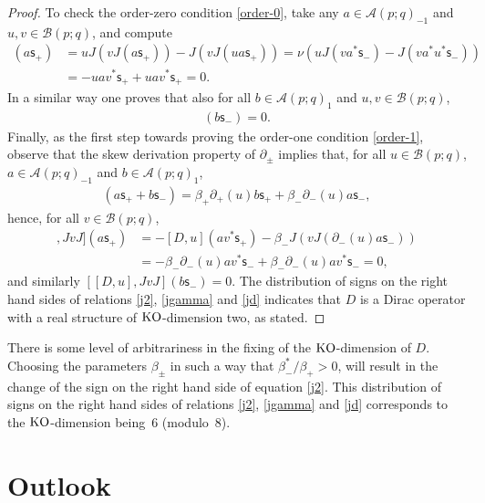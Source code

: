 \documentclass[pdftex]{sigma}
\numberwithin{equation}{section}
\def\Weyl#1#2{{\mathcal{B}}(#1;#2)}
\def\AWeyl#1#2{{\mathcal{A}}(#1;#2)}
\begin{document}
\begin{proof}
To check the order-zero condition \eqref{order-0}, take any $a\in \AWeyl p q_{-1}$ and $u,v\in \Weyl p q$, and compute
\begin{align*}
[u, J vJ](a {\mathsf{s}}_+) &= uJ ( vJ (a {\mathsf{s}}_+ ) ) - J ( vJ (ua {\mathsf{s}}_+ ) )
 = \nu (u J (v a^*{\mathsf{s}}_- ) - J (v a^*u^*{\mathsf{s}}_- ) )\\
&= -uav^*{\mathsf{s}}_+ +uav^*{\mathsf{s}}_+ =0.
\end{align*}
In a similar way one proves that also for all $b\in \AWeyl p q_{1}$ and $u,v\in \Weyl p q$,
\begin{gather*}
[u, J vJ](b {\mathsf{s}}_-)=0.
\end{gather*}
 Finally, as the f\/irst step towards proving the order-one condition \eqref{order-1}, observe that the skew derivation property of $\partial_\pm$ implies that, for all $u\in \Weyl p q$, $a\in \AWeyl p q_{-1}$ and $b\in \AWeyl p q_{1}$,
\begin{gather*}
[D,u](a {\mathsf{s}}_++b {\mathsf{s}}_-) = \beta_+\partial_+(u)b {\mathsf{s}}_++\beta_-\partial_-(u)a {\mathsf{s}}_-,
\end{gather*}
hence, for all $v\in \Weyl p q$,
\begin{align*}
[[D,u], J vJ] (a {\mathsf{s}}_+) &= - [D,u](av^*{\mathsf{s}}_+) - \beta_- J(vJ(\partial_-(u)a {\mathsf{s}}_-))\\
&= -\beta_-\partial_-(u)av^*{\mathsf{s}}_- +\beta_-\partial_-(u)av^*{\mathsf{s}}_- =0,
\end{align*}
and similarly $[[D,u], J vJ] (b {\mathsf{s}}_-) =0$. The distribution of signs on the right hand sides of relations \eqref{j2}, \eqref{jgamma} and \eqref{jd} indicates that $D$ is a Dirac operator with a real structure of ${\rm KO}$-dimension two, as stated.
\end{proof}

\begin{Remark}
There is some level of arbitrariness in the f\/ixing of the ${\rm KO}$-dimension of $D$. Choosing the parameters $\beta_\pm$ in such a way that $\beta_-^*/\beta_+>0$, will result in the change of the sign on the right hand side of equation \eqref{j2}. This distribution of signs on the right hand sides of relations \eqref{j2}, \eqref{jgamma} and \eqref{jd} corresponds to the ${\rm KO}$-dimension being~6 (modulo~8).
\end{Remark}

\section{Outlook}
\end{document}
